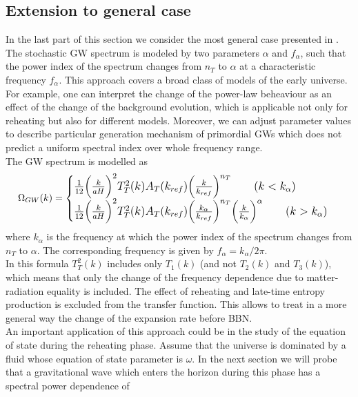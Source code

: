 \documentclass[11pt,a4paper,twoside]{book}
\begin{document}
\subsection{Extension to general case}
In the last part of this section we consider the most general case presented in \cite{Chap3:BlueTiltedSpectrum}. The stochastic GW spectrum is modeled by two parameters $\alpha$ and $ f_{\alpha} $, such that the power index of the spectrum changes from $ n_{T} $ to $\alpha$ at a characteristic frequency $ f_{\alpha} $. This approach covers a broad class of models of the early universe. For example, one can interpret the change of the power-law beheaviour as an effect of the change of the background evolution, which is applicable not only for reheating but also for different models. Moreover, we can adjust parameter values to describe particular generation mechanism of primordial GWs which does not predict a uniform spectral index over whole frequency range. \\
The GW spectrum is modelled as 
\
\begin{equation}
	\large
		\label{Chap3:GWExtension}
	\Omega_{GW}(k) = 
	\begin{cases}
		\frac{1}{12}\Big ( \frac{k}{aH} \Big)^{2} T_{T}^{2}(k)A_{T}(k_{ref})\Big (\frac{k}{k_{ref}}\Big)^{n_{T}} \qquad  (k<k_{\alpha})\\		
		\frac{1}{12}\Big (\frac{k}{aH} \Big)^{2} T_{T}^{2}(k)A_{T}(k_{ref})\Big (\frac{k_{\alpha}}{k_{ref}}\Big)^{n_{T}}\Big (\frac{k}{k_{\alpha}}\Big)^{\alpha} \qquad  (k>k_{\alpha})
	\end{cases}
\end{equation}
where $ k_{\alpha} $ is the frequency at which the power index of the spectrum changes from $ n_{T}  $ to $\alpha$. The corresponding frequency is given by $ f_{\alpha}=k_{\alpha}/2\pi $.\\
In this formula $ T_{T}^{2}(k) $ includes only $ T_{1}(k) $ (and not $ T_{2}(k) $ and $ T_{3}(k) $), which means  that only the change of the frequency dependence due to matter-radiation equality is included. The effect of reheating and late-time entropy production is excluded from the transfer function. This allows to treat in a more general way the change of the expansion rate before BBN.\\
An important application of this approach could be in the study of the equation of state during the reheating phase. Assume that the universe is dominated by a fluid whose equation of state parameter is $ \omega $. In the next section we will probe that a gravitational wave which enters the horizon during this phase has a spectral power dependence of
\end{document}
